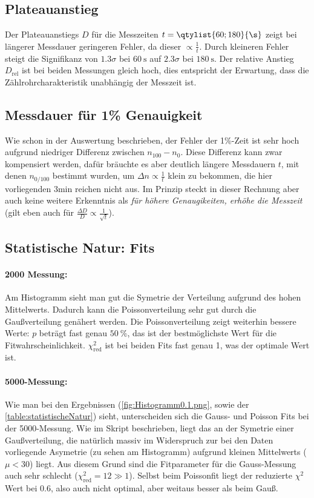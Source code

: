 
\subsection{Plateauanstieg}
Der Plateauanstiegs \(D\) für die Messzeiten \(t=\qtylist{60;180}{\s}\) zeigt bei längerer Messdauer geringeren Fehler, da dieser \(\propto\frac{1}{t}\). Durch kleineren Fehler steigt die Signifikanz von \(1.3\sigma\) bei \(\qty{60}{\s}\) auf \(2.3\sigma\) bei \(\qty{180}{\s}\). Der relative Anstieg \(D_\text{rel}\) ist bei beiden Messungen gleich hoch, dies entspricht der Erwartung, dass die Zählrohrcharakteristik unabhängig der Messzeit ist. 

\subsection{Messdauer für 1\% Genauigkeit}
Wie schon in der Auswertung beschrieben, der Fehler der 1\%-Zeit ist sehr hoch aufgrund niedriger Differenz zwischen \(n_{100}-n_0\). Diese Differenz kann zwar kompensiert werden, dafür bräuchte es aber deutlich längere Messdauern \(t\), mit denen \(n_{0/100}\) bestimmt wurden, um \(\Delta n\propto\frac{1}{t}\) klein zu bekommen, die hier vorliegenden 3min reichen nicht aus. Im Prinzip steckt in dieser Rechnung aber auch keine weitere Erkenntnis als \emph{für höhere Genaugikeiten, erhöhe die Messzeit} (gilt eben auch für \(\frac{\Delta D}{D}\propto\frac{1}{\sqrt{t}}\)).

\subsection{Statistische Natur: Fits}
\paragraph{2000 Messung:} Am Histogramm sieht man gut die Symetrie der Verteilung aufgrund des hohen Mittelwerts. Dadurch kann die Poissonverteilung sehr gut durch die Gaußverteilung genähert werden. Die Poissonverteilung zeigt weiterhin bessere Werte: \(p\) beträgt fast genau \(\qty{50}{\percent}\), das ist der bestmöglichste Wert für die Fitwahrscheinlichkeit. \(\chi^2_\text{red}\) ist bei beiden Fits fast genau 1, was der optimale Wert ist. 

\paragraph{5000-Messung:} Wie man bei den Ergebnissen (\cref{fig:Histogramm0.1.png}, sowie der \cref{table:statistischeNatur}) sieht, unterscheiden sich die Gauss- und Poisson Fits bei der 5000-Messung. Wie im Skript\autocite{Skript_2.2} beschrieben, liegt das an der Symetrie einer Gaußverteilung, die natürlich massiv im Widerspruch zur bei den Daten vorliegende Asymetrie (zu sehen am Histogramm) aufgrund kleinen Mittelwerts (\(\mu<30\)) liegt. Aus diesem Grund sind die Fitparameter für die Gauss-Messung auch sehr schlecht (\(\chi^2_\text{red}=12\gg1\)). Selbst beim Poissonfit liegt der reduzierte \(\chi^2\) Wert bei 0.6, also auch nicht optimal, aber weitaus besser als beim Gauß.

